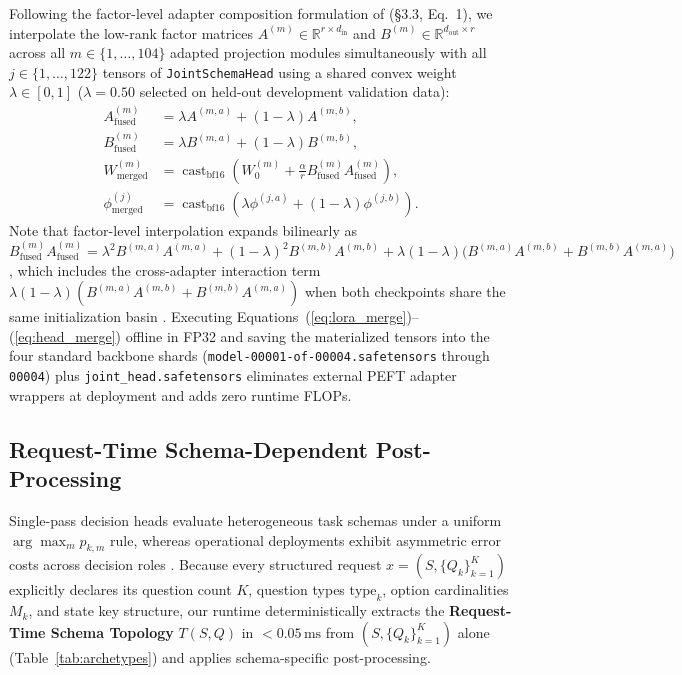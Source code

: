 \documentclass[10pt,twocolumn]{article}
\begin{document}
Following the factor-level adapter composition formulation of \citet{huang2024lorahub} (§3.3, Eq.~1), we interpolate the low-rank factor matrices $A^{(m)} \in \mathbb{R}^{r \times d_{\text{in}}}$ and $B^{(m)} \in \mathbb{R}^{d_{\text{out}} \times r}$ across all $m \in \{1,\dots,104\}$ adapted projection modules simultaneously with all $j \in \{1,\dots,122\}$ tensors of \texttt{JointSchemaHead} using a shared convex weight $\lambda \in [0, 1]$ ($\lambda = 0.50$ selected on held-out development validation data):
\begin{align}
    A_{\text{fused}}^{(m)} &= \lambda A^{(m,a)} + (1-\lambda) A^{(m,b)}, \nonumber \\
    B_{\text{fused}}^{(m)} &= \lambda B^{(m,a)} + (1-\lambda) B^{(m,b)}, \nonumber \\
    W_{\text{merged}}^{(m)} &= \operatorname{cast}_{\text{bf16}}\!\left(W_0^{(m)} + \frac{\alpha}{r} B_{\text{fused}}^{(m)} A_{\text{fused}}^{(m)}\right), \label{eq:lora_merge} \\
    \phi_{\text{merged}}^{(j)} &= \operatorname{cast}_{\text{bf16}}\!\left(\lambda \phi^{(j,a)} + (1-\lambda) \phi^{(j,b)}\right). \label{eq:head_merge}
\end{align}
Note that factor-level interpolation expands bilinearly as $B_{\text{fused}}^{(m)} A_{\text{fused}}^{(m)} = \lambda^2 B^{(m,a)} A^{(m,a)} + (1-\lambda)^2 B^{(m,b)} A^{(m,b)} + \lambda(1-\lambda)\big(B^{(m,a)} A^{(m,b)} + B^{(m,b)} A^{(m,a)}\big)$, which includes the cross-adapter interaction term $\lambda(1-\lambda)(B^{(m,a)} A^{(m,b)} + B^{(m,b)} A^{(m,a)})$ when both checkpoints share the same initialization basin \citep{huang2024lorahub}. Executing Equations~(\ref{eq:lora_merge})--(\ref{eq:head_merge}) offline in FP32 and saving the materialized tensors into the four standard backbone shards (\texttt{model-00001-of-00004.safetensors} through \texttt{00004}) plus \texttt{joint\_head.safetensors} eliminates external PEFT adapter wrappers at deployment and adds zero runtime FLOPs.

\subsection{Request-Time Schema-Dependent Post-Processing}
\label{sec:postproc}
Single-pass decision heads evaluate heterogeneous task schemas under a uniform $\arg\max_m p_{k,m}$ rule, whereas operational deployments exhibit asymmetric error costs across decision roles \citep{elkan2001foundations}. Because every structured request $x = (S, \{Q_k\}_{k=1}^K)$ explicitly declares its question count $K$, question types $\text{type}_k$, option cardinalities $M_k$, and state key structure, our runtime deterministically extracts the \textbf{Request-Time Schema Topology} $T(S, Q)$ in $<0.05\,\text{ms}$ from $(S, \{Q_k\}_{k=1}^K)$ alone (Table~\ref{tab:archetypes}) and applies schema-specific post-processing.
\end{document}
